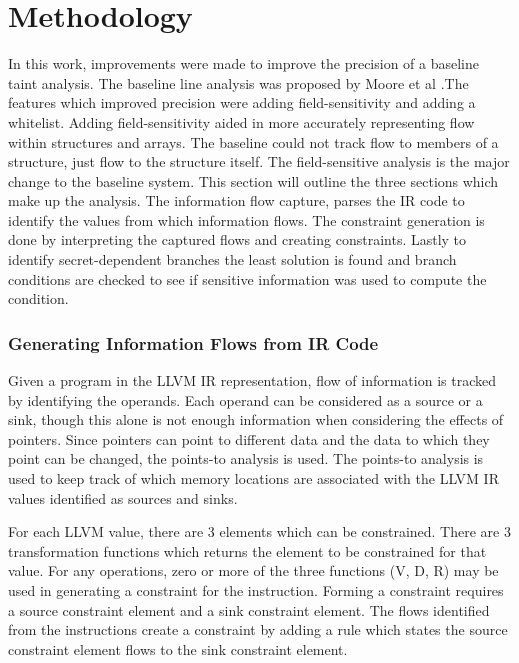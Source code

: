 \chapter{Methodology}
In this work, improvements were made to improve the precision of a baseline
taint analysis. The baseline line analysis was proposed by Moore et al
\cite{moore2011static}.The features which improved precision were adding
field-sensitivity and adding a whitelist. Adding field-sensitivity aided in more
accurately representing flow within structures and arrays. The baseline could
not track flow to members of a structure, just flow to the structure itself. The
field-sensitive analysis is the major change to the baseline system. This
section will outline the three sections which make up the analysis. The
information flow capture, parses the IR code to identify the values from which
information flows. The constraint generation is done by interpreting the
captured flows and creating constraints. Lastly to identify secret-dependent
branches the least solution is found and branch conditions are checked to see if
sensitive information was used to compute the condition.

\subsection{Generating Information Flows from IR Code}

   Given a program in the LLVM IR representation, flow of information is tracked
   by identifying the operands. Each operand can be considered as a source or a
   sink, though this alone is not enough information when considering the
   effects of pointers. Since pointers can point to different data and the data
   to which they point can be changed, the points-to analysis is used. The
   points-to analysis is used to keep track of which memory locations are
   associated with the LLVM IR values identified as sources and sinks.

   For each LLVM value, there are 3 elements which can be constrained. There are
   3 transformation functions which returns the element to be constrained for
   that value. For any operations, zero or more of the three functions (V, D, R)
   may be used in generating a constraint for the instruction. Forming a
   constraint requires a source constraint element and a sink constraint
   element. The flows identified from the instructions create a constraint by
   adding a rule which states the source constraint element flows to the sink
   constraint element.

